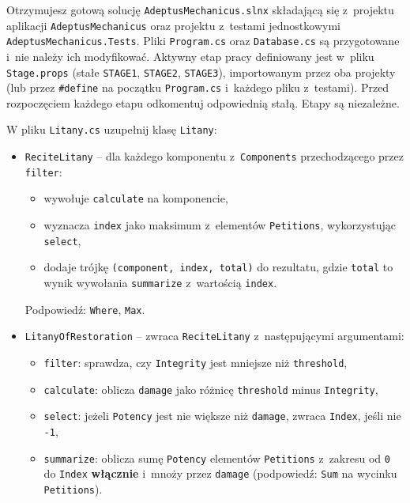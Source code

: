 \documentclass[11pt,a4paper,addpoints]{exam}
\renewcommand*\half{.5}
\begin{document}
\cellwidth{2.75cm}
\noindent \gradetable[h]

\vspace{0.4cm}

Otrzymujesz gotową solucję \texttt{AdeptusMechanicus.slnx} składającą się z~projektu aplikacji \texttt{AdeptusMechanicus} oraz projektu z~testami jednostkowymi \texttt{AdeptusMechanicus.Tests}. Pliki \texttt{Program.cs} oraz \texttt{Database.cs} są przygotowane i~nie należy ich modyfikować. Aktywny etap pracy definiowany jest w~pliku \texttt{Stage.props} (stałe \texttt{STAGE1}, \texttt{STAGE2}, \texttt{STAGE3}), importowanym przez oba projekty (lub przez \texttt{\#define} na początku \texttt{Program.cs} i~każdego pliku z~testami). Przed rozpoczęciem każdego etapu odkomentuj odpowiednią stałą. Etapy są niezależne.

\begin{questions}

\question[1\half] W pliku \texttt{Litany.cs} uzupełnij klasę \texttt{Litany}:
\begin{itemize}
    \item \texttt{ReciteLitany} -- dla każdego komponentu z~\texttt{Components} przechodzącego przez \texttt{filter}:
    \begin{itemize}
        \item wywołuje \texttt{calculate} na komponencie,
        \item wyznacza \texttt{index} jako maksimum z~elementów \texttt{Petitions}, wykorzystując \texttt{select},
        \item dodaje trójkę \texttt{(component, index, total)} do rezultatu, gdzie \texttt{total} to wynik wywołania \texttt{summarize} z~wartością \texttt{index}.
    \end{itemize}
    Podpowiedź: \texttt{Where}, \texttt{Max}.
    \item \texttt{LitanyOfRestoration} -- zwraca \texttt{ReciteLitany} z~następującymi argumentami:
    \begin{itemize}
        \item \texttt{filter}: sprawdza, czy \texttt{Integrity} jest mniejsze niż \texttt{threshold},
        \item \texttt{calculate}: oblicza \texttt{damage} jako różnicę \texttt{threshold} minus \texttt{Integrity},
        \item \texttt{select}: jeżeli \texttt{Potency} jest nie większe niż \texttt{damage}, zwraca \texttt{Index}, jeśli nie \texttt{-1},
        \item \texttt{summarize}: oblicza sumę \texttt{Potency} elementów \texttt{Petitions} z~zakresu od \texttt{0} do \texttt{Index} \textbf{włącznie} i~mnoży przez \texttt{damage} (podpowiedź: \texttt{Sum} na wycinku \texttt{Petitions}).
    \end{itemize}
\end{itemize}


\end{questions}
\end{document}
